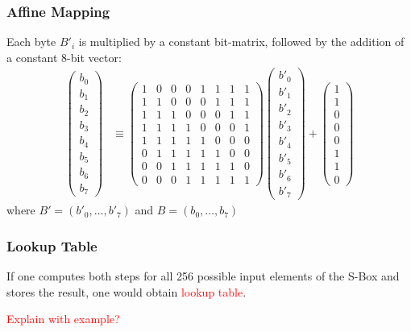 \subsubsection{Affine Mapping}

Each byte ${B'}_i$ is multiplied by a constant bit-matrix, followed by the addition of a constant 8-bit vector:
\begin{align}
    \begin{pmatrix}
        b_0\\
        b_1\\
        b_2\\
        b_3\\
        b_4\\
        b_5\\
        b_6\\
        b_7
    \end{pmatrix}
    &\equiv
    \begin{pmatrix}
        1 & 0 & 0 & 0 & 1 & 1 & 1 & 1\\
        1 & 1 & 0 & 0 & 0 & 1 & 1 & 1\\
        1 & 1 & 1 & 0 & 0 & 0 & 1 & 1\\
        1 & 1 & 1 & 1 & 0 & 0 & 0 & 1\\
        1 & 1 & 1 & 1 & 1 & 0 & 0 & 0\\
        0 & 1 & 1 & 1 & 1 & 1 & 0 & 0\\
        0 & 0 & 1 & 1 & 1 & 1 & 1 & 0\\
        0 & 0 & 0 & 1 & 1 & 1 & 1 & 1
    \end{pmatrix}
    \begin{pmatrix}
        {b'}_0\\
        {b'}_1\\
        {b'}_2\\
        {b'}_3\\
        {b'}_4\\
        {b'}_5\\
        {b'}_6\\
        {b'}_7
    \end{pmatrix}
    +
    \begin{pmatrix}
        1\\
        1\\
        0\\
        0\\
        0\\
        1\\
        1\\
        0
    \end{pmatrix}
\end{align}
where ${B'} = \left( {b'}_0, \dots, {b'}_7 \right)$ and $B = \left( b_0, \dots, b_7 \right)$

\subsubsection{Lookup Table}

If one computes both steps for all 256 possible input elements of the S-Box and stores the result, one would obtain \textcolor{red}{lookup table}.

\textcolor{red}{Explain with example?}
